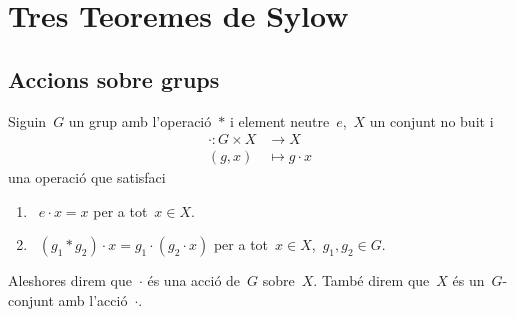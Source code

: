 \documentclass[../../main.tex]{subfiles}
\begin{document}
\section{Tres Teoremes de Sylow}
    \subsection{Accions sobre grups}
    \begin{definition}
        \label{def:acció d'un grup sobre un conjunt}
        Siguin~\(G\) un grup amb l'operació~\(\ast\) i element neutre~\(e\),~\(X\) un conjunt no buit i
        \begin{align*}
        \cdot\colon G\times X&\longrightarrow X\\
        (g,x)&\longmapsto g\cdot x
        \end{align*}
        una operació que satisfaci
        \begin{enumerate}
            \item~\(e\cdot x=x\) per a tot~\(x\in X\).
            \item~\((g_{1}\ast g_{2})\cdot x=g_{1}\cdot(g_{2}\cdot x)\) per a tot~\(x\in X\),~\(g_{1},g_{2}\in G\).
        \end{enumerate}
        Aleshores direm que~\(\cdot\) és una acció de~\(G\) sobre~\(X\).
        També direm que~\(X\) és un~\(G\)-conjunt amb l'acció~\(\cdot\).
    \end{definition}
\end{document}
